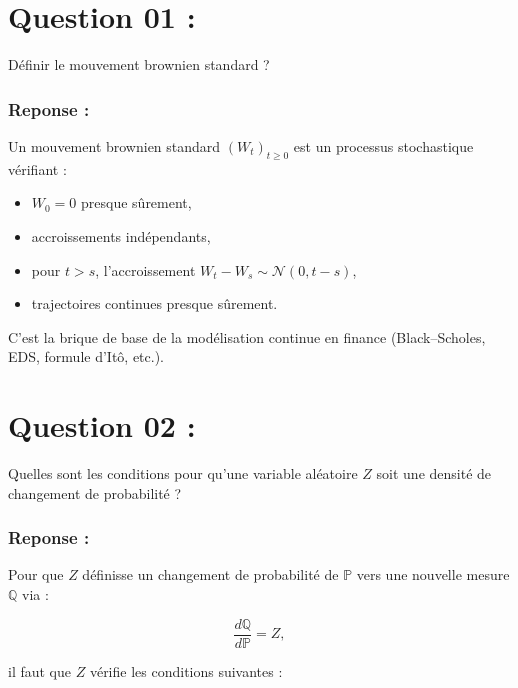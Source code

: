 \documentclass[11pt,a4paper]{article}
\begin{document}
\section{Question 01 :}

\begin{questionbox}
Définir le mouvement brownien standard ? 
\end{questionbox}


\subsubsection*{Reponse : }
Un mouvement brownien standard $(W_t)_{t \ge 0}$ est un processus stochastique vérifiant :
\begin{itemize}
    \item $W_0 = 0$ presque sûrement,
    \item accroissements indépendants,
    \item pour $t > s$, l'accroissement $W_t - W_s \sim \mathcal{N}(0, t-s)$,
    \item trajectoires continues presque sûrement.
\end{itemize}
C’est la brique de base de la modélisation continue en finance (Black–Scholes, EDS, formule d’Itô, etc.).
\newpage 

\section{Question 02 :}

\begin{questionbox}
Quelles sont les conditions pour qu'une variable aléatoire $Z$ soit une densité de changement de probabilité ?
    
\end{questionbox}

\subsubsection*{Reponse : }
Pour que $Z$ définisse un changement de probabilité de $\mathbb{P}$ vers une nouvelle mesure $\mathbb{Q}$ via :

\[
\frac{d\mathbb{Q}}{d\mathbb{P}} = Z,
\]

il faut que $Z$ vérifie les conditions suivantes :
\end{document}
